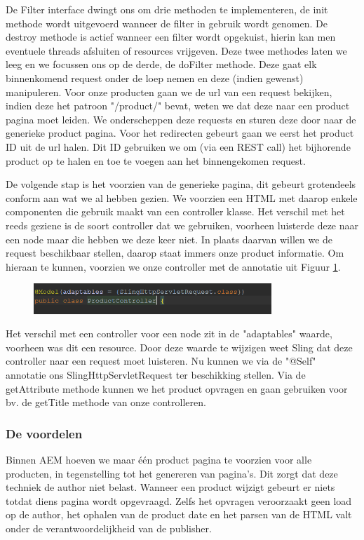 \documentclass{article}
\begin{document}
    De Filter interface dwingt ons om drie methoden te implementeren, de init methode wordt uitgevoerd wanneer de filter in gebruik wordt genomen. De destroy methode is actief wanneer een filter wordt opgekuist, hierin kan men eventuele threads afsluiten of resources vrijgeven. Deze twee methodes laten we leeg en we focussen ons op de derde, de doFilter methode. Deze gaat elk binnenkomend request onder de loep nemen en deze (indien gewenst) manipuleren. Voor onze producten gaan we de url van een request bekijken, indien deze het patroon "/product/" bevat, weten we dat deze naar een product pagina moet leiden. We onderscheppen deze requests en sturen deze door naar de generieke product pagina. Voor het redirecten gebeurt gaan we eerst het product ID uit de url halen. Dit ID gebruiken we om (via een REST call) het bijhorende product op te halen en toe te voegen aan het binnengekomen request.
    \par
    De volgende stap is het voorzien van de generieke pagina, dit gebeurt grotendeels conform aan wat we al hebben gezien. We voorzien een HTML met daarop enkele componenten die gebruik maakt van een controller klasse. Het verschil met het reeds geziene is de soort controller dat we gebruiken, voorheen luisterde deze naar een node maar die hebben we deze keer niet. In plaats daarvan willen we de request beschikbaar stellen, daarop staat immers onze product informatie. Om hieraan te kunnen, voorzien we onze controller met de annotatie uit Figuur \ref{fig:request-controller}.

    \begin{figure}[h!]
  		\includegraphics[width=0.8\textwidth]{images/request-controller.PNG}
  		\label{fig:request-controller}
	\end{figure}
    
    Het verschil met een controller voor een node zit in de "adaptables" waarde, voorheen was dit een resource. Door deze waarde te wijzigen weet Sling dat deze controller naar een request moet luisteren. Nu kunnen we via de "@Self" annotatie ons SlingHttpServletRequest ter beschikking stellen. Via de getAttribute methode kunnen we het product opvragen en gaan gebruiken voor bv. de getTitle methode van onze controlleren. 
	\subsubsection{De voordelen}
    Binnen AEM hoeven we maar \'e\'en product pagina te voorzien voor alle producten, in tegenstelling tot het genereren van pagina's. Dit zorgt dat deze techniek de author niet belast. Wanneer een product wijzigt gebeurt er niets totdat diens pagina wordt opgevraagd. Zelfs het opvragen veroorzaakt geen load op de author, het ophalen van de product date en het parsen van de HTML valt onder de verantwoordelijkheid van de publisher.
\end{document}
